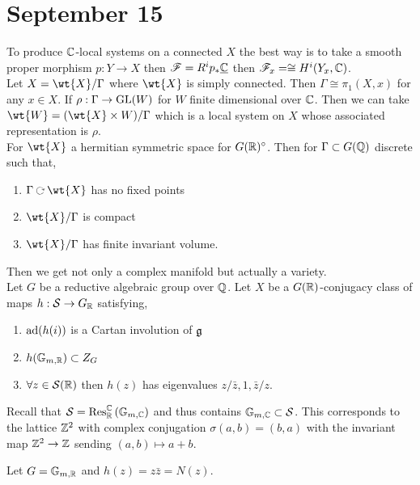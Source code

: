 \documentclass[12pt]{article}
\begin{document}
\section{September 15}

\newcommand{\GmX}[1]{\mathbb{G}_{m, #1}}

To produce $\mathbb{C}$-local systems on a connected $X$ the best way is to take a smooth proper morphism $p : Y \to X$ then $\mathscr{F} = R^i p_* \underline{\mathbb{C}}$ then $\mathscr{F}_x = \cong H^i(Y_x, \mathbb{C})$.
\bigskip\\
Let $X = \wt{X} / \Gamma$ where $\wt{X}$ is simply connected. Then $\Gamma \cong \pi_1(X, x)$ for any $x \in X$. If $\rho : \Gamma \to \mathrm{GL}(W)$ for $W$ finite dimensional over $\mathbb{C}$. Then we can take $\wt{W} = (\wt{X} \times W) / \Gamma$ which is a local system on $X$ whose associated representation is $\rho$. 
\bigskip\\
For $\wt{X}$ a hermitian symmetric space for $G(\mathbb{R})^\circ$. Then for $\Gamma \subset G(\mathbb{Q})$ discrete such that,
\begin{enumerate}
\item $\Gamma \acts \wt{X}$ has no fixed points
\item $\wt{X} / \Gamma$ is compact
\item $\wt{X} / \Gamma$ has finite invariant volume. 
\end{enumerate}
Then we get not only a complex manifold but actually a variety. 
\bigskip\\
Let $G$ be a reductive algebraic group over $\mathbb{Q}$. Let $X$ be a $G(\mathbb{R})$-conjugacy class of maps $h : \mathcal{S} \to G_{\mathbb{R}}$ satisfying,
\begin{enumerate}
\item $\mathrm{ad}(h(i))$ is a Cartan involution of $\mathfrak{g}$
\item $h(\GmX{\RR}) \subset Z_G$
\item $\forall z \in \mathcal{S}(\mathbb{R})$ then $h(z)$ has eigenvalues $z / \bar{z}, 1, \bar{z}/z$.
\end{enumerate}

\begin{rmk}
Recall that $\mathcal{S} = \mathrm{Res}^{\mathbb{C}}_{\mathbb{R}} \left( \mathbb{G}_{m,\mathbb{C}} \right)$ and thus contains $\mathbb{G}_{m,\mathbb{C}} \subset \mathcal{S}$. This corresponds to the lattice $\mathbb{Z}^2$ with complex conjugation $\sigma(a,b) = (b,a)$ with the invariant map $\mathbb{Z}^2 \to \mathbb{Z}$ sending $(a,b) \mapsto a + b$.
\end{rmk}

\begin{example}
Let $G = \GmX{\RR}$ and $h(z) = z \bar{z} = N(z)$. 
\end{example}
\end{document}
